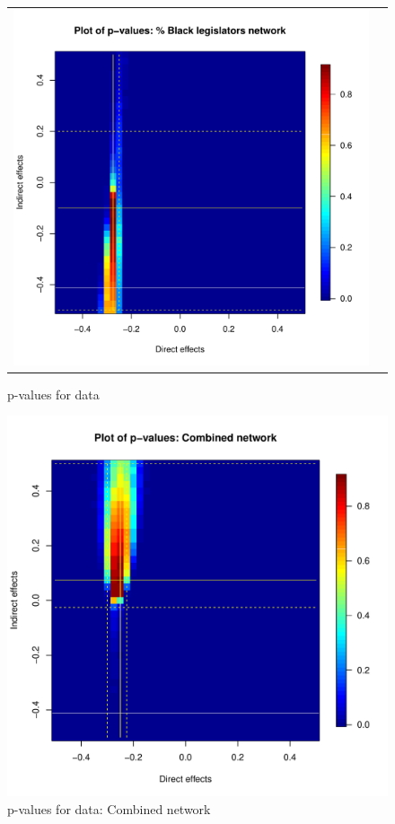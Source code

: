 \documentclass[12pt]{article}
\begin{document}
\begin{figure}
\begin{tabular}{cc}
	\includegraphics[scale=0.45]{./images/pval_plot_broockman_blackpct_raw.pdf} \\ 
	\end{tabular}
	\caption{p-values for \citet{broockman2013black} data}
\end{figure}

\begin{figure}
\centering
\includegraphics[scale=0.45]{./images/pval_plot_broockman_demvotepct_blackpct_raw.pdf}
\caption{p-values for \citet{broockman2013black} data: Combined network}
\end{figure}
\end{document}
